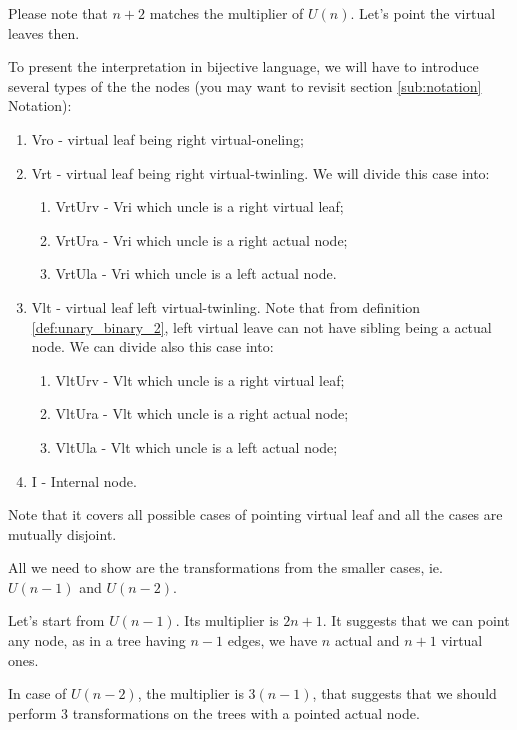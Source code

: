 \documentclass[final]{article}
\theoremstyle{definition}
\theoremstyle{remark}
\begin{document}
Please note that \(n + 2\) matches the multiplier of \(U(n)\). Let's point the virtual leaves then.

To present the interpretation in bijective language, we will have to introduce several types of the the nodes (you may want to revisit section \ref{sub:notation} Notation):

\begin{enumerate}
    \item Vro - virtual leaf being right virtual-oneling;
    \item Vrt - virtual leaf being right virtual-twinling. We will divide this case into:
        \begin{enumerate}
            \item VrtUrv - Vri which uncle is a right virtual leaf;
            \item VrtUra - Vri which uncle is a right actual node;
            \item VrtUla - Vri which uncle is a left actual node.
        \end{enumerate}
    \item Vlt - virtual leaf left virtual-twinling. Note that from definition \ref{def:unary_binary_2}, left virtual leave can not have sibling being a actual node. We can divide also this case into:
        \begin{enumerate}
            \item VltUrv - Vlt which uncle is a right virtual leaf;
            \item VltUra - Vlt which uncle is a right actual node;
            \item VltUla - Vlt which uncle is a left actual node;
        \end{enumerate}
    \item I - Internal node.
\end{enumerate}

Note that it covers all possible cases of pointing virtual leaf and all the cases are mutually disjoint.

All we need to show are the transformations from the smaller cases, ie. \(U(n-1)\) and \(U(n-2)\).

Let's start from \(U(n-1)\). Its multiplier is \(2n + 1\). It suggests that we can point any node, as in a tree having \(n - 1\) edges, we have \(n\) actual and \(n + 1\) virtual ones.

In case of \(U(n-2)\), the multiplier is \(3(n-1)\), that suggests that we should perform \(3\) transformations on the trees with a pointed actual node.
\end{document}

